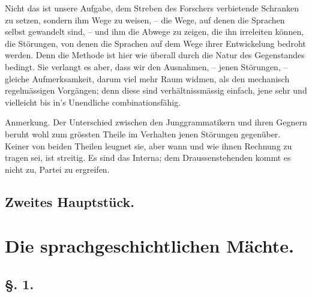 {Nicht das ist unsere Aufgabe, dem Streben des Forschers verbietende Schranken zu setzen, sondern ihm Wege zu weisen, – die Wege, auf denen die Sprachen selbst gewandelt sind, – und ihm die Abwege zu zeigen, die ihn irreleiten können, die Störungen, von denen die Sprachen auf dem Wege ihrer \label{sp.181} Entwickelung bedroht werden. Denn die Methode ist hier wie überall durch die Natur des Gegenstandes bedingt. Sie verlangt es aber, dass wir den Ausnahmen, – jenen Störungen, – gleiche Aufmerksamkeit, darum viel mehr Raum widmen, als den mechanisch regelmässigen Vorgängen; denn diese sind verhältnissmässig einfach, jene sehr  und vielleicht bis in’s Unendliche combinationsfähig. 

\begin{styleAnmerk}
Anmerkung. Der Unterschied zwischen den  Junggrammatikern und ihren Gegnern beruht wohl zum grössten Theile im Verhalten jenen Störungen gegenüber. Keiner von beiden Theilen leugnet sie, aber wann und wie ihnen Rechnung zu tragen sei, ist streitig. Es sind das Interna; dem Draussenstehenden kommt es nicht zu, Partei zu ergreifen.
\end{styleAnmerk}

\subsection*{Zweites Hauptstück.}
\section*{Die sprachgeschichtlichen Mächte.}
\subsection*{§. 1.}\label{III.II.II.1}
}
